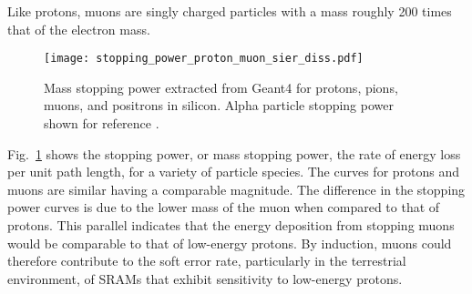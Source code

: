 Like protons, muons are singly charged particles with a mass roughly 200 times that of the electron mass.
\begin{figure}[htbp]
    \begin{center}
        \texttt{[image: stopping\_power\_proton\_muon\_sier\_diss.pdf]}
    \end{center}
    \caption[Mass stopping power extracted from Geant4 for protons, pions, muons, and positrons in silicon. Alpha particle stopping power shown for reference.]{Mass stopping power extracted from Geant4 for protons, pions, muons, and positrons in silicon. Alpha particle stopping power shown for reference \cite{Sierawski:2011bn}.}
    \label{fig:stopping_power_protons_muons}
\end{figure}
Fig.~\ref{fig:stopping_power_protons_muons} shows the stopping power, or mass stopping power, the rate of energy loss per unit path length, for a variety of particle species.
The curves for protons and muons are similar having a comparable magnitude.
The difference in the stopping power curves is due to the lower mass of the muon when compared to that of protons.
This parallel indicates that the energy deposition from stopping muons would be comparable to that of low-energy protons.
By induction, muons could therefore contribute to the soft error rate, particularly in the terrestrial environment, of SRAMs that exhibit sensitivity to low-energy protons.

